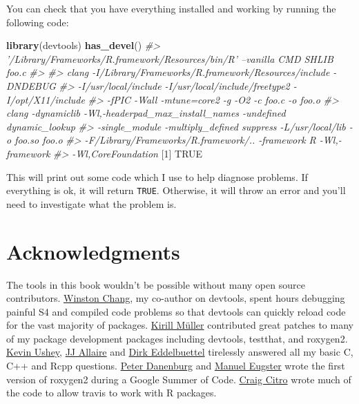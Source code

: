 \documentclass[]{book}
\newenvironment{Shaded}{\begin{snugshade}}{\end{snugshade}}
\newcommand{\CommentTok}[1]{\textcolor[rgb]{0.56,0.35,0.01}{\textit{#1}}}
\newcommand{\DecValTok}[1]{\textcolor[rgb]{0.00,0.00,0.81}{#1}}
\newcommand{\KeywordTok}[1]{\textcolor[rgb]{0.13,0.29,0.53}{\textbf{#1}}}
\newcommand{\NormalTok}[1]{#1}
\newcommand{\OtherTok}[1]{\textcolor[rgb]{0.56,0.35,0.01}{#1}}
\begin{document}
You can check that you have everything installed and working by running the following code:

\begin{Shaded}
\begin{Highlighting}[]
\KeywordTok{library}\NormalTok{(devtools)}
\KeywordTok{has_devel}\NormalTok{()}
\CommentTok{#> '/Library/Frameworks/R.framework/Resources/bin/R' --vanilla CMD SHLIB foo.c }
\CommentTok{#> }
\CommentTok{#> clang -I/Library/Frameworks/R.framework/Resources/include -DNDEBUG }
\CommentTok{#>   -I/usr/local/include -I/usr/local/include/freetype2 -I/opt/X11/include}
\CommentTok{#>   -fPIC  -Wall -mtune=core2 -g -O2  -c foo.c -o foo.o}
\CommentTok{#> clang -dynamiclib -Wl,-headerpad_max_install_names -undefined dynamic_lookup}
\CommentTok{#>   -single_module -multiply_defined suppress -L/usr/local/lib -o foo.so foo.o }
\CommentTok{#>   -F/Library/Frameworks/R.framework/.. -framework R -Wl,-framework }
\CommentTok{#>   -Wl,CoreFoundation}
\NormalTok{[}\DecValTok{1}\NormalTok{] }\OtherTok{TRUE}
\end{Highlighting}
\end{Shaded}

This will print out some code which I use to help diagnose problems. If everything is ok, it will return \texttt{TRUE}. Otherwise, it will throw an error and you'll need to investigate what the problem is.

\hypertarget{intro-ack}{%
\section{Acknowledgments}\label{intro-ack}}

The tools in this book wouldn't be possible without many open source contributors. \href{https://github.com/wch/}{Winston Chang}, my co-author on devtools, spent hours debugging painful S4 and compiled code problems so that devtools can quickly reload code for the vast majority of packages. \href{https://github.com/krlmlr}{Kirill Müller} contributed great patches to many of my package development packages including devtools, testthat, and roxygen2. \href{http://github.com/kevinushey}{Kevin Ushey}, \href{https://github.com/jjallaire}{JJ Allaire} and \href{http://dirk.eddelbuettel.com}{Dirk Eddelbuettel} tirelessly answered all my basic C, C++ and Rcpp questions. \href{https://github.com/klutometis}{Peter Danenburg} and \href{http://www.statistik.lmu.de/~eugster/}{Manuel Eugster} wrote the first version of roxygen2 during a Google Summer of Code. \href{https://github.com/craigcitro}{Craig Citro} wrote much of the code to allow travis to work with R packages.
\end{document}
